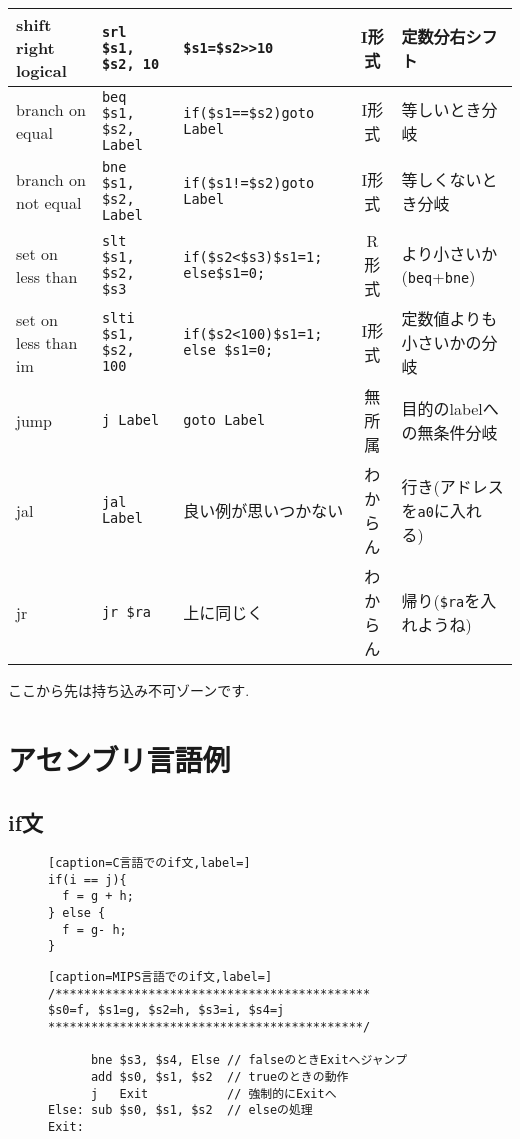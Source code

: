 \documentclass[a4paper, xelatex, ja=standard]{bxjsarticle}
\begin{document}
\begin{table}[h]
{\begin{tabular}{|l|l|l|c|l|}
shift right logical        & \texttt{srl \$s1, \$s2, 10}    & \texttt{\$s1=\$s2>>10} & I形式 & 定数分右シフト \\ \hline
branch on equal            & \texttt{beq \$s1, \$s2, Label} & \texttt{if(\$s1==\$s2)goto Label} & I形式 & 等しいとき分岐 \\ \hline
branch on not equal        & \texttt{bne \$s1, \$s2, Label} & \texttt{if(\$s1!=\$s2)goto Label} & I形式 & 等しくないとき分岐 \\ \hline
set on less than           & \texttt{slt \$s1, \$s2, \$s3}  & \texttt{if(\$s2<\$s3)\$s1=1; else\$s1=0;} & R形式 & より小さいか(\texttt{beq}+\texttt{bne})\\\hline
set on less than im & \texttt{slti \$s1, \$s2, 100}  & \texttt{if(\$s2<100)\$s1=1; else \$s1=0;} & I形式 &定数値よりも小さいかの分岐 \\ \hline
jump                       & \texttt{j Label} & \texttt{goto Label} & 無所属 & 目的のlabelへの無条件分岐\\ \hline
jal & \texttt{jal Label} & 良い例が思いつかない & わからん & 行き(アドレスを\texttt{a0}に入れる) \\ \hline
jr                   & \texttt{jr \$ra} & 上に同じく & わからん & 帰り(\texttt{\$ra}を入れようね) \\ \hline
\end{tabular}
}
\end{table}

\clearpage
\begin{center}
ここから先は持ち込み不可ゾーンです.
\end{center}
\section{アセンブリ言語例}
\subsection{if文}

\begin{figure}[h]
\centering
\begin{minipage}[t]{0.3\linewidth}
\begin{lstlisting}[caption=C言語でのif文,label=]
if(i == j){
  f = g + h;
} else {
  f = g- h;
}
\end{lstlisting}
\end{minipage}
\hspace{15pt}
\begin{minipage}[t]{0.5\linewidth}
\begin{lstlisting}[caption=MIPS言語でのif文,label=]
/********************************************
$s0=f, $s1=g, $s2=h, $s3=i, $s4=j
********************************************/

      bne $s3, $s4, Else // falseのときExitへジャンプ
      add $s0, $s1, $s2  // trueのときの動作
      j   Exit           // 強制的にExitへ
Else: sub $s0, $s1, $s2  // elseの処理
Exit:
\end{lstlisting}
\end{minipage}
\label{}
\end{figure}
\end{document}
